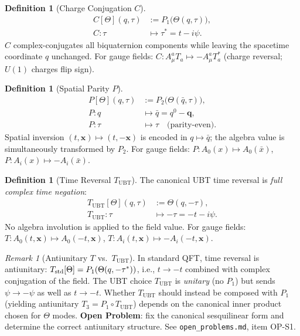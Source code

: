 \documentclass[12pt,a4paper]{article}
\theoremstyle{definition}
\newtheorem{definition}[theorem]{Definition}
\theoremstyle{remark}
\newtheorem{remark}[theorem]{Remark}
\begin{document}
\begin{definition}[Charge Conjugation $C$]
\label{def:ds:C}
\begin{align}
  C[\Theta](q,\tau) &:= P_1\!\bigl(\Theta(q,\tau)\bigr), \label{eq:ds:C_field} \\
  C: \tau &\mapsto \tau^* = t - i\psi. \label{eq:ds:C_tau}
\end{align}
$C$ complex-conjugates all biquaternion components while leaving the spacetime
coordinate $q$ unchanged.
For gauge fields: $C: A_\mu^a T_a \mapsto -A_\mu^a T_a^*$
(charge reversal; $U(1)$ charges flip sign).
\end{definition}

\begin{definition}[Spatial Parity $P$]
\label{def:ds:P}
\begin{align}
  P[\Theta](q,\tau) &:= P_2\!\bigl(\Theta(\bar{q},\tau)\bigr), \label{eq:ds:P_field} \\
  P: q &\mapsto \bar{q} = q^0 - \mathbf{q}, \label{eq:ds:P_coord} \\
  P: \tau &\mapsto \tau \quad \text{(parity-even)}. \label{eq:ds:P_tau}
\end{align}
Spatial inversion $(t,\mathbf{x})\mapsto(t,-\mathbf{x})$ is encoded in
$q\mapsto\bar{q}$; the algebra value is simultaneously transformed by $P_2$.
For gauge fields: $P: A_0(x)\mapsto A_0(\bar{x})$, $P: A_i(x)\mapsto -A_i(\bar{x})$.
\end{definition}

\begin{definition}[Time Reversal $T_{\mathrm{UBT}}$]
\label{def:ds:T}
The canonical UBT time reversal is \emph{full complex time negation}:
\begin{align}
  T_{\mathrm{UBT}}[\Theta](q,\tau) &:= \Theta(q,-\tau), \label{eq:ds:T_field} \\
  T_{\mathrm{UBT}}: \tau &\mapsto -\tau = -t - i\psi. \label{eq:ds:T_tau}
\end{align}
No algebra involution is applied to the field value.
For gauge fields: $T: A_0(t,\mathbf{x})\mapsto A_0(-t,\mathbf{x})$,
$T: A_i(t,\mathbf{x})\mapsto -A_i(-t,\mathbf{x})$.
\end{definition}

\begin{remark}[Antiunitary $T$ vs.\ $T_{\mathrm{UBT}}$]
\label{rem:ds:antiunitary}
In standard QFT, time reversal is antiunitary: $T_{\rm std}[\Theta]=P_1(\Theta(q,-\tau^*))$,
i.e., $t\to-t$ combined with complex conjugation of the field.
The UBT choice $T_{\mathrm{UBT}}$ is \emph{unitary} (no $P_1$) but sends
$\psi\to-\psi$ as well as $t\to-t$.
Whether $T_{\mathrm{UBT}}$ should instead be composed with $P_1$ (yielding
antiunitary $T_3 = P_1 \circ T_{\mathrm{UBT}}$) depends on the canonical
inner product chosen for $\Theta$ modes.
\textbf{Open Problem}: fix the canonical sesquilinear form and determine
the correct antiunitary structure.
See \texttt{open\_problems.md}, item OP-S1.
\end{remark}
\end{document}
